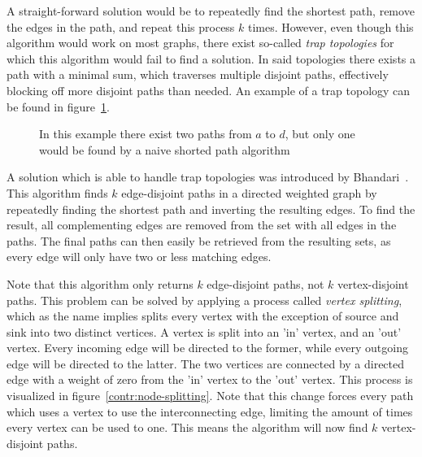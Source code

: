 A straight-forward solution would be to repeatedly find the shortest path, remove the edges in the path, and repeat this process $k$ times. However, even though this algorithm would work on most graphs, there exist so-called \textit{trap topologies} for which this algorithm would fail to find a solution. In said topologies there exists a path with a minimal sum, which traverses multiple disjoint paths, effectively blocking off more disjoint paths than needed. An example of a trap topology can be found in figure~\ref{contr:trap-topology}.


\begin{figure}[h]
    \centering
    \caption{In this example there exist two paths from $a$ to $d$, but only one would be found by a naive shorted path algorithm}
    \label{contr:trap-topology}
\end{figure}

A solution which is able to handle trap topologies was introduced by Bhandari~\citationneeded. This algorithm finds $k$ edge-disjoint paths in a directed weighted graph by repeatedly finding the shortest path and inverting the resulting edges. To find the result, all complementing edges are removed from the set with all edges in the paths. The final paths can then easily be retrieved from the resulting sets, as every edge will only have two or less matching edges.

Note that this algorithm only returns $k$ edge-disjoint paths, not $k$ vertex-disjoint paths. This problem can be solved by applying a process called \textit{vertex splitting}, which as the name implies splits every vertex with the exception of source and sink into two distinct vertices. 
A vertex is split into an 'in' vertex, and an 'out' vertex. Every incoming edge will be directed to the former, while every outgoing edge will be directed to the latter. The two vertices are connected by a directed edge with a weight of zero from the 'in' vertex to the 'out' vertex. This process is visualized in figure~\ref{contr:node-splitting}. Note that this change forces every path which uses a vertex to use the interconnecting edge, limiting the amount of times every vertex can be used to one. This means the algorithm will now find $k$ vertex-disjoint paths.

